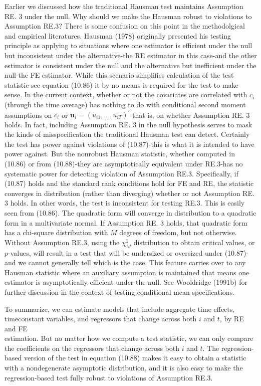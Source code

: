\documentclass[10pt]{article}
\begin{document}
Earlier we discussed how the traditional Hausman test maintains Assumption RE. 3 under the null. Why should we make the Hausman robust to violations to Assumption RE.3? There is some confusion on this point in the methodolgical and empirical literatures. Hausman (1978) originally presented his testing principle as applying to situations where one estimator is efficient under the null but inconsistent under the alternative-the RE estimator in this case-and the other estimator is consistent under the null and the alternative but inefficient under the null-the FE estimator. While this scenario simplifies calculation of the test statistic-see equation (10.86)-it by no means is required for the test to make sense. In the current context, whether or not the covariates are correlated with $c_{i}$ (through the time average) has nothing to do with conditional second moment assumptions on $c_{i}$ or $\mathbf{u}_{i}=\left(u_{i 1}, \ldots, u_{i T}\right)^{\prime}$-that is, on whether Assumption RE. 3 holds. In fact, including Assumption RE. 3 in the null hypothesis serves to mask the kinds of misspecification the traditional Hausman test can detect. Certainly the test has power against violations of (10.87)-this is what it is intended to have power against. But the nonrobust Hausman statistic, whether computed in (10.86) or from (10.88)-they are asymptotically equivalent under RE.3-has no systematic power for detecting violation of Assumption RE.3. Specifically, if (10.87) holds and the standard rank conditions hold for FE and RE, the statistic converges in distribution (rather than diverging) whether or not Assumption RE. 3 holds. In other words, the test is inconsistent for testing RE.3. This is easily seen from (10.86). The quadratic form will converge in distribution to a quadratic form in a multivariate normal. If Assumption RE. 3 holds, that quadratic form has a chi-square distribution with $M$ degrees of freedom, but not otherwise. Without Assumption RE.3, using the $\chi_{M}^{2}$ distribution to obtain critical values, or $p$-values, will result in a test that will be undersized or oversized under (10.87)-and we cannot generally tell which is the case. This feature carries over to any Hausman statistic where an auxiliary assumption is maintained that means one estimator is asymptotically efficient under the null. See Wooldridge (1991b) for further discussion in the context of testing conditional mean specifications.

To summarize, we can estimate models that include aggregate time effects, timeconstant variables, and regressors that change across both $i$ and $t$, by RE and FE\\
estimation. But no matter how we compute a test statistic, we can only compare the coefficients on the regressors that change across both $i$ and $t$. The regression-based version of the test in equation (10.88) makes it easy to obtain a statistic with a nondegenerate asymptotic distribution, and it is also easy to make the regression-based test fully robust to violations of Assumption RE.3.
\end{document}
